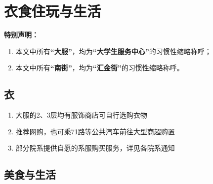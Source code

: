 \chapter[衣食住玩与生活]{衣食住玩与生活}
\vspace{-2em}
\noindent\textbf{特别声明：}
\begin{enumerate}
    \item 本文中所有\textbf{“大服”}，均为\textbf{“大学生服务中心”}的习惯性缩略称呼；
    \item 本文中所有\textbf{“南街”}，均为\textbf{“汇金街”}的习惯性缩略称呼。
\end{enumerate}
\section[衣]{衣}
\begin{enumerate}
    \item 大服的2、3层均有服饰商店可自行选购衣物
    \item 推荐网购，也可乘71路等公共汽车前往大型商超购置
    \item 部分院系提供自愿的系服购买服务，详见各院系通知
\end{enumerate}

\section[美食与生活]{美食与生活\footnotemark \footnotemark \footnotemark \footnotemark \footnotemark}

